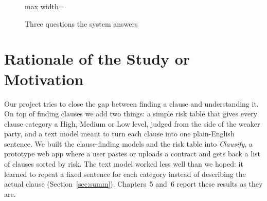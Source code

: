 \begin{figure}[ht]
\centering
\begin{adjustbox}{max width=\textwidth}
\end{adjustbox}
\caption{Three questions the system answers}
\label{fig:overview}
\end{figure}

\section{Rationale of the Study or Motivation}
Our project tries to close the gap between finding a clause and understanding it. On top of finding clauses we add two things: a simple risk table that gives every clause category a High, Medium or Low level, judged from the side of the weaker party, and a text model meant to turn each clause into one plain-English sentence. We built the clause-finding models and the risk table into \emph{Clausify}, a prototype web app where a user pastes or uploads a contract and gets back a list of clauses sorted by risk. The text model worked less well than we hoped: it learned to repeat a fixed sentence for each category instead of describing the actual clause (Section~\ref{sec:summ}). Chapters~5 and~6 report these results as they are.

